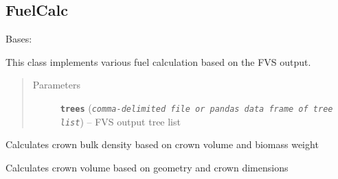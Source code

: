 \documentclass[letterpaper,10pt,english]{sphinxmanual}
\begin{document}
\begin{fulllineitems}
\begin{fulllineitems}
\begin{quote}
\begin{description}
\end{description}\end{quote}

\end{fulllineitems}


\end{fulllineitems}



\subsection{FuelCalc}
\label{fuels_FuelCalc:fuelcalc}\label{fuels_FuelCalc::doc}

\begin{fulllineitems}
\label{fuels_FuelCalc:fuels.FuelCalc}
Bases: 

This class implements various fuel calculation based on the FVS output.
\begin{quote}\begin{description}
\item[{Parameters}] \leavevmode
\textbf{\texttt{trees}} (\emph{\texttt{comma-delimited file or pandas data frame of tree list}}) -- FVS output tree list

\end{description}\end{quote}

\begin{fulllineitems}
\label{fuels_FuelCalc:fuels.FuelCalc.calc_bulk_density}
Calculates crown bulk density based on crown volume and biomass weight

\end{fulllineitems}


\begin{fulllineitems}
\label{fuels_FuelCalc:fuels.FuelCalc.calc_crown_volume}
Calculates crown volume based on geometry and crown dimensions

\end{fulllineitems}



\end{fulllineitems}
\end{document}
